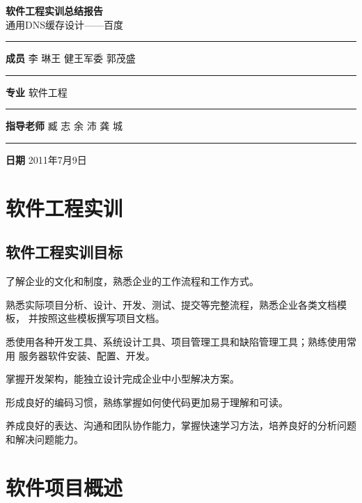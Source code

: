 \documentclass[12pt, a4paper, titlepage]{article}
\begin{document}
\begin{titlepage}
\centering
\Huge\textbf{软件工程实训总结报告}\\[20pt]
\Large{通用DNS缓存设计——百度}  \\[130mm]

\begin{large}
\rule{40mm}{0pt}
\textbf{成\qquad 员} {\hfill 李 琳\quad 王 健\quad 王军委
\quad 郭茂盛 } \\ 
\rule{40mm}{0pt}
\textbf{专\qquad 业} {\hfill 软\quad 件\quad 工\quad 程\quad\quad\quad\quad } \\
\rule{40mm}{0pt}
\textbf{指导老师} {\hfill 臧 志 \quad 余 沛 \quad 龚 城\quad\quad\quad} \\
\rule{40mm}{0pt}
\textbf{日\qquad 期}{ \hfill2011年7月9日\quad\quad\quad } \\
\end{large}
\end{titlepage}

\newpage
{}%

\tableofcontents
\newpage
{}
\section{软件工程实训}
\subsection{软件工程实训目标}
\begin{asparaenum}
\item{了解企业的文化和制度，熟悉企业的工作流程和工作方式。}
\item{熟悉实际项目分析、设计、开发、测试、提交等完整流程，熟悉企业各类文档模板，
并按照这些模板撰写项目文档。}
\item{悉使用各种开发工具、系统设计工具、项目管理工具和缺陷管理工具；熟练使用常用
服务器软件安装、配置、开发。}
\item{掌握开发架构，能独立设计完成企业中小型解决方案。}
\item{形成良好的编码习惯，熟练掌握如何使代码更加易于理解和可读。}
\item{养成良好的表达、沟通和团队协作能力，掌握快速学习方法，培养良好的分析问题
和解决问题能力。}
\end{asparaenum}

\section{软件项目概述}
\end{document}
